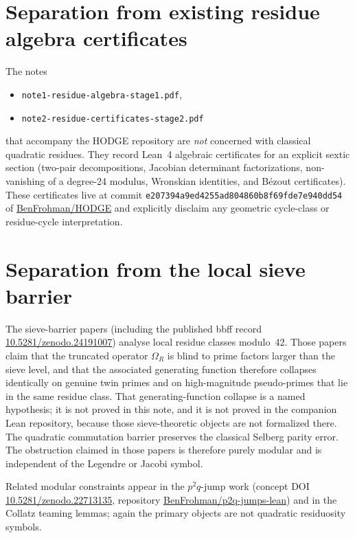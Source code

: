 \documentclass[11pt,a4paper]{article}
\begin{document}
\section{Separation from existing residue algebra certificates}

The notes
\begin{itemize}
\item \texttt{note1-residue-algebra-stage1.pdf},
\item \texttt{note2-residue-certificates-stage2.pdf}
\end{itemize}
that accompany the HODGE repository are \emph{not} concerned with classical quadratic residues. They record Lean~4 algebraic certificates for an explicit sextic section (two-pair decompositions, Jacobian determinant factorizations, non-vanishing of a degree-24 modulus, Wronskian identities, and Bézout certificates). These certificates live at commit
\texttt{e207394a9ed4255a\allowbreak d804860b8f69fde7e940dd54}
of \href{https://github.com/BenFrohman/HODGE}{BenFrohman/HODGE} and explicitly disclaim any geometric cycle-class or residue-cycle interpretation.

\section{Separation from the local sieve barrier}

The sieve-barrier papers (including the published bbff record \href{https://doi.org/10.5281/zenodo.24191007}{10.5281/zenodo.24191007}) analyse local residue classes modulo~42. Those papers claim that the truncated operator \(\Omega_R\) is blind to prime factors larger than the sieve level, and that the associated generating function therefore collapses identically on genuine twin primes and on high-magnitude pseudo-primes that lie in the same residue class. That generating-function collapse is a named hypothesis; it is not proved in this note, and it is not proved in the companion Lean repository, because those sieve-theoretic objects are not formalized there. The quadratic commutation barrier preserves the classical Selberg parity error. The obstruction claimed in those papers is therefore purely modular and is independent of the Legendre or Jacobi symbol.

Related modular constraints appear in the \(p^2q\)-jump work (concept DOI \href{https://doi.org/10.5281/zenodo.22713135}{10.5281/zenodo.22713135}, repository \href{https://github.com/BenFrohman/p2q-jumps-lean}{BenFrohman/p2q-jumps-lean}) and in the Collatz teaming lemmas; again the primary objects are not quadratic residuosity symbols.
\end{document}
